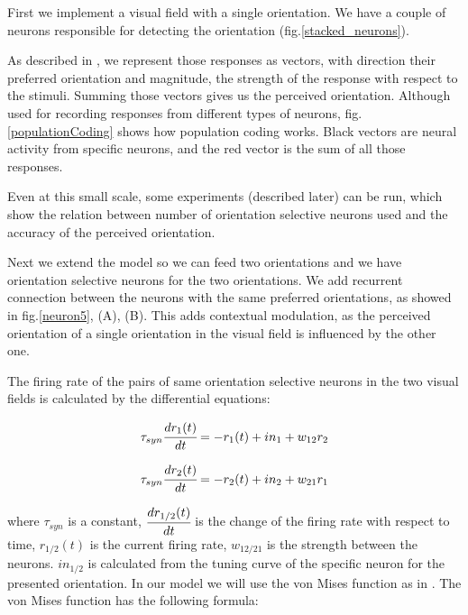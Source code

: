 First we implement a visual field with a single orientation. We have a couple of neurons responsible for detecting the orientation (fig.\ref{stacked_neurons}).

As described in \cite{keemink2015unified}, we represent those responses as vectors, with direction their preferred orientation and magnitude, the strength of the response with respect to the stimuli. Summing those vectors gives us the perceived orientation. Although used for recording responses from different types of neurons, fig.\ref{populationCoding} shows how population coding works. Black vectors are neural activity from specific neurons, and the red vector is the sum of all those responses.

Even at this small scale, some experiments (described later) can be run, which show the relation between number of orientation selective neurons used and the accuracy of the perceived orientation.

Next we extend the model so we can feed two orientations and we have orientation selective neurons for the two orientations. We add recurrent connection between the neurons with the same preferred orientations, as showed in fig.\ref{neuron5}, (A), (B). This adds contextual modulation, as the perceived orientation of a single orientation in the visual field is influenced by the other one.

The firing rate of the pairs of same orientation selective neurons in the two visual fields is calculated by the differential equations:

\begin{equation}
\label{model11}
\tau_{syn}\cfrac{dr_{1}(t)}{dt}=-r_{1}(t)+in_{1}+w_{12}r_{2}
\end{equation}


\begin{equation}
\label{model12}
\tau_{syn}\cfrac{dr_{2}(t)}{dt}=-r_{2}(t)+in_{2}+w_{21}r_{1}
\end{equation}

where $\tau_{syn}$ is a constant, $\cfrac{dr_{1/2}(t)}{dt}$ is the change of the firing rate with respect to time, $r_{1/2}(t)$ is the current firing rate, $w_{12/21}$ is the strength between the neurons. $in_{1/2}$ is calculated from the tuning curve of the specific neuron for the  presented orientation. In our model we will use the von Mises function as in \cite{keemink2015unified}. The von Mises function has the following formula:



